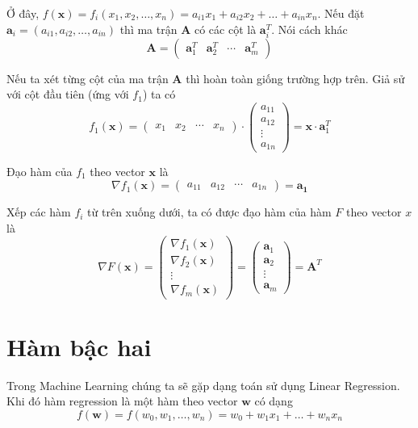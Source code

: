 \documentclass{mynotes}
\begin{document}
Ở đây, $f(\bm{x}) = f_i(x_1, x_2, \ldots, x_n) = a_{i1} x_1 + a_{i2} x_2 + \ldots + a_{in} x_n$. Nếu đặt $\bm{a}_i = (a_{i1}, a_{i2}, \ldots, a_{in})$ thì ma trận $\bm{A}$ có các cột là $\bm{a}_i^T$. Nói cách khác \[\bm{A} = \begin{pmatrix}
    \bm{a}_1^T & \bm{a}_2^T & \cdots & \bm{a}_m^T
\end{pmatrix}\]

Nếu ta xét từng cột của ma trận $\bm{A}$ thì hoàn toàn giống trường hợp trên. Giả sử với cột đầu tiên (ứng với $f_1$) ta có \[ f_1 (\bm{x}) = \begin{pmatrix}
    x_1 & x_2 & \cdots & x_n
\end{pmatrix} \cdot \begin{pmatrix}
    a_{11} \\ a_{12} \\ \vdots \\ a_{1n}\end{pmatrix} = \bm{x} \cdot \bm{a}_1^T \]

Đạo hàm của $f_1$ theo vector $\bm{x}$ là \[\nabla f_1 (\bm{x}) = \begin{pmatrix}
    a_{11} & a_{12} & \cdots & a_{1n} 
\end{pmatrix} = \bm{a_1}\]

Xếp các hàm $f_i$ từ trên xuống dưới, ta có được đạo hàm của hàm $F$ theo vector $x$ là \begin{equation}
    \nabla F(\bm{x}) = \begin{pmatrix}
        \nabla f_1 (\bm{x}) \\ \nabla f_2 (\bm{x}) \\ \vdots \\ \nabla f_m(\bm{x})
    \end{pmatrix}  = \begin{pmatrix}
    \bm{a}_1 \\ \bm{a}_2 \\ \vdots \\ \bm{a}_m
    \end{pmatrix} = \bm{A}^T
\end{equation}

\section*{Hàm bậc hai}

Trong Machine Learning chúng ta sẽ gặp dạng toán sử dụng Linear Regression. Khi đó hàm regression là một hàm theo vector $\bm{w}$ có dạng \[ f(\bm{w}) = f (w_0, w_1, \ldots, w_n) = w_0 + w_1 x_1 + \ldots + w_n x_n \]
\end{document}
